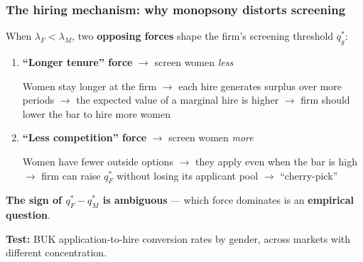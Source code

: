 \documentclass[aspectratio=169, 11pt]{beamer}
\begin{document}
\begin{frame}
\frametitle{The hiring mechanism: why monopsony distorts screening}

When $\lambda_F < \lambda_M$, two \textbf{opposing forces} shape the firm's screening threshold $q_g^*$:

\vspace{0.3cm}
\begin{enumerate}
    \item \textbf{``Longer tenure'' force} $\to$ screen women \emph{less}

    Women stay longer at the firm $\to$ each hire generates surplus over more periods $\to$ the expected value of a marginal hire is higher $\to$ firm should lower the bar to hire more women

    \bigskip
    \item \textbf{``Less competition'' force} $\to$ screen women \emph{more}

    Women have fewer outside options $\to$ they apply even when the bar is high $\to$ firm can raise $q_F^*$ without losing its applicant pool $\to$ ``cherry-pick''
\end{enumerate}

\vspace{0.3cm}
\textbf{The sign of $q_F^* - q_M^*$ is ambiguous} --- which force dominates is an \textbf{empirical question}.

\vspace{0.2cm}
\textbf{Test:} BUK application-to-hire conversion rates by gender, across markets with different concentration.

\end{frame}
\end{document}
